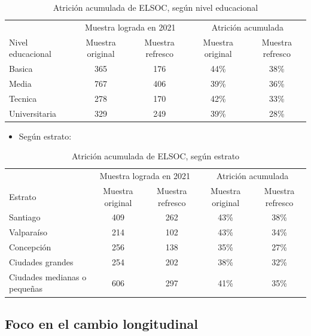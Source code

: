 \documentclass[
  12pt,
]{book}
\providecommand{\tightlist}{%
  \setlength{\itemsep}{0pt}\setlength{\parskip}{0pt}}
\begin{document}
\begin{table}

\caption{\label{tab:tabla-atricion-educ}Atrición acumulada de ELSOC, según nivel educacional}
\centering
\begin{tabular}[t]{l|c|c|c|c}
\hline
\multicolumn{1}{c|}{ } & \multicolumn{2}{c|}{Muestra lograda en 2021} & \multicolumn{2}{c}{Atrición acumulada} \\
\cline{2-3} \cline{4-5}
Nivel educacional & Muestra original & Muestra refresco & Muestra original & Muestra refresco\\
\hline
Basica & 365 & 176 & 44\% & 38\%\\
\hline
Media & 767 & 406 & 39\% & 36\%\\
\hline
Tecnica & 278 & 170 & 42\% & 33\%\\
\hline
Universitaria & 329 & 249 & 39\% & 28\%\\
\hline
\end{tabular}
\end{table}

\begin{itemize}
\tightlist
\item
  Según estrato:
\end{itemize}

\begin{table}

\caption{\label{tab:tabla-atricion-estrato}Atrición acumulada de ELSOC, según estrato}
\centering
\begin{tabular}[t]{l|c|c|c|c}
\hline
\multicolumn{1}{c|}{ } & \multicolumn{2}{c|}{Muestra lograda en 2021} & \multicolumn{2}{c}{Atrición acumulada} \\
\cline{2-3} \cline{4-5}
Estrato & Muestra original & Muestra refresco & Muestra original & Muestra refresco\\
\hline
Santiago & 409 & 262 & 43\% & 38\%\\
\hline
Valparaíso & 214 & 102 & 43\% & 34\%\\
\hline
Concepción & 256 & 138 & 35\% & 27\%\\
\hline
Ciudades
grandes & 254 & 202 & 38\% & 32\%\\
\hline
Ciudades medianas
o pequeñas & 606 & 297 & 41\% & 35\%\\
\hline
\end{tabular}
\end{table}

\hypertarget{foco-en-el-cambio-longitudinal}{%
\subsection{Foco en el cambio longitudinal}\label{foco-en-el-cambio-longitudinal}}
\end{document}
